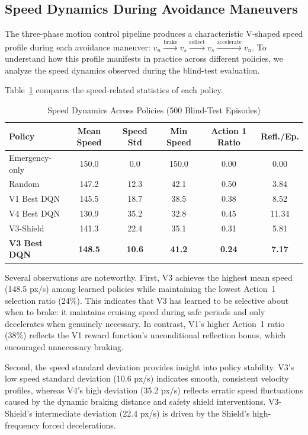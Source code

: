 \documentclass[conference]{IEEEtran}
\begin{document}
\subsection{Speed Dynamics During Avoidance Maneuvers}

The three-phase motion control pipeline produces a characteristic V-shaped speed profile during each avoidance maneuver: $v_n \xrightarrow{\text{brake}} v_s \xrightarrow{\text{reflect}} v_s \xrightarrow{\text{accelerate}} v_n$. To understand how this profile manifests in practice across different policies, we analyze the speed dynamics observed during the blind-test evaluation.

Table~\ref{tab:speed_dynamics} compares the speed-related statistics of each policy.

\begin{table}[H]
\centering
\caption{Speed Dynamics Across Policies (500 Blind-Test Episodes)}
\label{tab:speed_dynamics}
\begin{tabular}{@{}lccccc@{}}
\toprule
\textbf{Policy} & \textbf{Mean Speed} & \textbf{Speed Std} & \textbf{Min Speed} & \textbf{Action 1 Ratio} & \textbf{Refl./Ep.} \\
\midrule
Emergency-only  & 150.0 & 0.0  & 150.0 & 0.00 & 0.00 \\
Random          & 147.2 & 12.3 & 42.1  & 0.50 & 3.84 \\
V1 Best DQN     & 145.5 & 18.7 & 38.5  & 0.38 & 8.52 \\
V4 Best DQN     & 130.9 & 35.2 & 32.8  & 0.45 & 11.34 \\
V3-Shield       & 141.3 & 22.4 & 35.1  & 0.31 & 5.81 \\
\textbf{V3 Best DQN} & \textbf{148.5} & \textbf{10.6} & \textbf{41.2} & \textbf{0.24} & \textbf{7.17} \\
\bottomrule
\end{tabular}
\end{table}

Several observations are noteworthy. First, V3 achieves the highest mean speed (148.5 px/s) among learned policies while maintaining the lowest Action~1 selection ratio (24\%). This indicates that V3 has learned to be selective about when to brake: it maintains cruising speed during safe periods and only decelerates when genuinely necessary. In contrast, V1's higher Action~1 ratio (38\%) reflects the V1 reward function's unconditional reflection bonus, which encouraged unnecessary braking.

Second, the speed standard deviation provides insight into policy stability. V3's low speed standard deviation (10.6 px/s) indicates smooth, consistent velocity profiles, whereas V4's high deviation (35.2 px/s) reflects erratic speed fluctuations caused by the dynamic braking distance and safety shield interventions. V3-Shield's intermediate deviation (22.4 px/s) is driven by the Shield's high-frequency forced decelerations.
\end{document}
